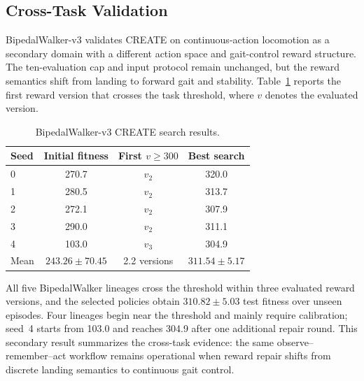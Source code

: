 \subsection{Cross-Task Validation}
\label{sec:cross_task}

BipedalWalker-v3 validates CREATE on continuous-action locomotion as a secondary domain with a different action space and gait-control reward structure. The ten-evaluation cap and input protocol remain unchanged, but the reward semantics shift from landing to forward gait and stability. Table~\ref{tab:bipedal} reports the first reward version that crosses the task threshold, where $v$ denotes the evaluated version.

\begin{table}[!h]
\caption{BipedalWalker-v3 CREATE search results.}
\label{tab:bipedal}
\centering
\footnotesize
\setlength{\tabcolsep}{4.0pt}
\begin{tabular}{@{}lccc@{}}
\toprule
Seed & Initial fitness & First $v\!\geq\!300$ & Best search \\
\midrule
0 & 270.7 & $v_2$ & 320.0 \\
1 & 280.5 & $v_2$ & 313.7 \\
2 & 272.1 & $v_2$ & 307.9 \\
3 & 290.0 & $v_2$ & 311.1 \\
4 & 103.0 & $v_3$ & 304.9 \\
\midrule
Mean & $243.26\pm70.45$ & 2.2 versions & $311.54\pm5.17$ \\
\bottomrule
\end{tabular}
\end{table}

All five BipedalWalker lineages cross the threshold within three evaluated reward versions, and the selected policies obtain $310.82\pm5.03$ test fitness over unseen episodes. Four lineages begin near the threshold and mainly require calibration; seed~4 starts from 103.0 and reaches 304.9 after one additional repair round. This secondary result summarizes the cross-task evidence: the same observe--remember--act workflow remains operational when reward repair shifts from discrete landing semantics to continuous gait control.
